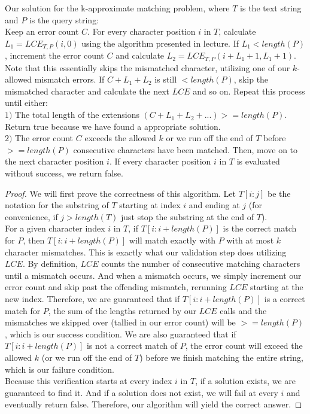 \documentclass{article}
\theoremstyle{casestyle}
\begin{document}
Our solution for the k-approximate matching problem, where $T$ is the text string and $P$ is the query string:\\

Keep an error count $C$. For every character position $i$ in $T$, calculate $L_1 = LCE_{T, P}(i, 0)$ using the algorithm presented in lecture. If $L_1 < length(P)$, increment the error count $C$ and calculate $L_2 = LCE_{T, P}(i + L_1 + 1, L_1 + 1)$. Note that this essentially skips the mismatched character, utilizing one of our $k$-allowed mismatch errors. If $C + L_1 + L_2$ is still $< length(P)$, skip the mismatched character and calculate the next $LCE$ and so on. Repeat this process until either:\\
$1)$ The total length of the extensions $(C + L_1 + L_2 + ...) >= length(P)$. Return true because we have found a appropriate solution.\\
$2)$ The error count $C$ exceeds the allowed $k$ or we run off the end of $T$ before $>= length(P)$ consecutive characters have been matched. Then, move on to the next character position $i$. If every character position $i$ in $T$ is evaluated without success, we return false.\\

\begin{proof} 
We will first prove the correctness of this algorithm. Let $T[i:j]$ be the notation for the substring of $T$ starting at index $i$ and ending at $j$ (for convenience, if $j > length(T)$ just stop the substring at the end of $T$).\\

For a given character index $i$ in $T$, if $T[i:i+length(P)]$ is the correct match for $P$, then $T[i:i+length(P)]$ will match exactly with $P$ with at most $k$ character mismatches. This is exactly what our validation step does utilizing $LCE$. By definition, $LCE$ counts the number of consecutive matching characters until a mismatch occurs. And when a mismatch occurs, we simply increment our error count and skip past the offending mismatch, rerunning $LCE$ starting at the new index. Therefore, we are guaranteed that if $T[i:i+length(P)]$ is a correct match for $P$, the sum of the lengths returned by our $LCE$ calls and the mismatches we skipped over (tallied in our error count) will be $>= length(P)$, which is our success condition. We are also guaranteed that if $T[i:i+length(P)]$ is not a correct match of $P$, the error count will exceed the allowed $k$ (or we run off the end of $T$) before we finish matching the entire string, which is our failure condition.\\

Because this verification starts at every index $i$ in $T$, if a solution exists, we are guaranteed to find it. And if a solution does not exist, we will fail at every $i$ and eventually return false. Therefore, our algorithm will yield the correct answer.
\end{proof}
\end{document}
